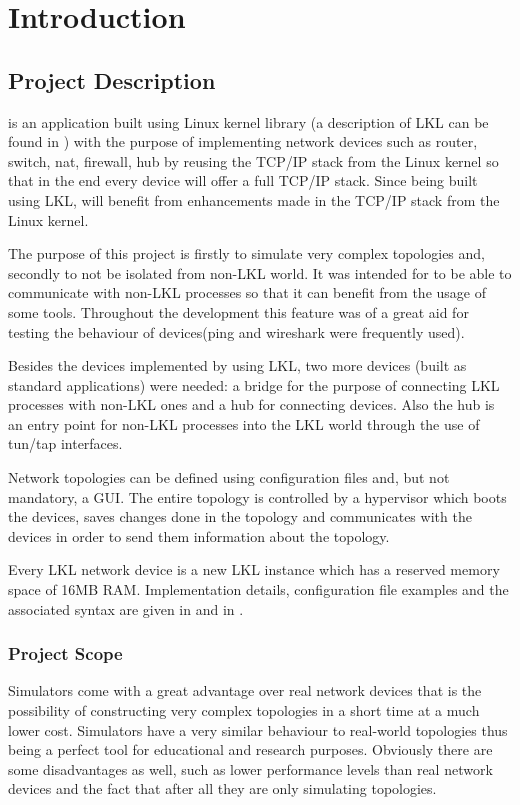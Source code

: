 \chapter{Introduction}
\label{chapter:intro}

\section{Project Description}
\label{sec:proj}

\project is an application built using Linux kernel library (a description of LKL can be found in ) with the purpose of implementing network devices such as router, switch, nat, firewall, hub by reusing the TCP/IP stack from the Linux kernel so that in the end every device will offer a full TCP/IP stack. Since being built using LKL, \project will benefit from enhancements made in the TCP/IP stack from the Linux kernel.

The purpose of this project is firstly to simulate very complex topologies and, secondly to not be isolated from non-LKL world.
It was intended for \project to be able to communicate with non-LKL processes so that it can benefit from the usage of some tools. Throughout the \project development this feature was of a great aid for testing the behaviour of devices(ping and wireshark were frequently used). 

Besides the devices implemented by using LKL, two more devices (built as standard applications) were needed: a bridge for the purpose of connecting LKL processes with non-LKL ones and a hub for connecting \project devices. Also the hub is an entry point for non-LKL processes into the LKL world through the use of tun/tap interfaces.  

Network topologies can be defined using configuration files and, but not mandatory, a GUI. The entire topology is controlled by a hypervisor which boots the devices, saves changes done in the topology and communicates with the devices in order to send them information about the topology.

Every LKL network device is a new LKL instance which has a reserved memory space of 16MB RAM.
Implementation details, configuration file examples and the associated syntax are given in  and in .
\subsection{Project Scope}
\label{sub-sec:proj-scope}
Simulators come with a great advantage over real network devices that is the possibility of constructing very complex topologies in a short time at a much lower cost. Simulators have a very similar behaviour to real-world topologies thus being a perfect tool for educational and research purposes. Obviously there are some disadvantages as well, such as lower performance levels than real network devices and the fact that after all they are only simulating topologies.

